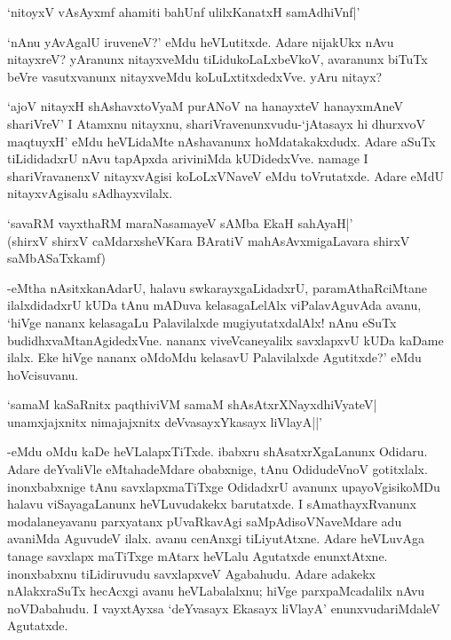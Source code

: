 \begin{shloka}
`nitoyxV vAsAyxmf ahamiti bahUnf ulilxKanatxH samAdhiVnf|'
\end{shloka}

`nAnu yAvAgalU iruveneV?' eMdu heVLutitxde. Adare nijakUkx nAvu nitayxreV? yAranunx nitayxveMdu tiLidukoLaLxbeVkoV, avaranunx biTuTx beVre vasutxvanunx nitayxveMdu koLuLxtitxdedxVve. yAru nitayx?

`ajoV nitayxH shAshavxtoV\s yaM purANoV na hanayxteV hanayxmAneV shariVreV' I Atamxnu nitayxnu, shariVravenunxvudu-`jAtasayx hi dhurxvoV maqtuyxH' eMdu heVLidaMte nAshavanunx hoMdatakakxdudx. Adare aSuTx tiLididadxrU nAvu tapApxda ariviniMda kUDidedxVve. namage I shariVravanenxV nitayxvAgisi koLoLxVNaveV eMdu toVrutatxde. Adare eMdU nitayxvAgisalu sAdhayxvilalx.

\begin{shloka}
`savaRM vayxthaRM maraNasamayeV sAMba EkaH sahAyaH|'\\
(shirxV shirxV caMdarxsheVKara BAratiV mahAsAvxmigaLavara shirxV\\
saMbASaTxkamf)
\end{shloka}

-eMtha nAsitxkanAdarU, halavu swkarayxgaLidadxrU, paramAthaRciMtane ilalxdidadxrU kUDa tAnu mADuva kelasagaLelAlx viPalavAguvAda avanu, `hiVge nananx kelasagaLu Palavilalxde mugiyutatxdalAlx! nAnu eSuTx budidhxvaMtanAgidedxVne. nananx viveVcaneyalilx savxlapxvU kUDa kaDame ilalx. Eke hiVge nananx oMdoMdu kelasavU Palavilalxde Agutitxde?' eMdu hoVcisuvanu.

\begin{shloka}
`samaM kaSaRnitx paqthiviVM samaM shAsAtxrXNayxdhiVyateV|\\
unamxjajxnitx nimajajxnitx deVvasayxYkasayx liVlayA||'
\end{shloka}

-eMdu oMdu kaDe heVLalapxTiTxde. ibabxru shAsatxrXgaLanunx Odidaru. Adare deYvaliVle eMtahadeMdare obabxnige, tAnu OdidudeVnoV gotitxlalx. inonxbabxnige tAnu savxlapxmaTiTxge OdidadxrU avanunx upayoVgisikoMDu halavu viSayagaLanunx heVLuvudakekx barutatxde. I sAmathayxRvanunx modalaneyavanu parxyatanx pUvaRkavAgi saMpAdisoVNaveMdare adu avaniMda AguvudeV ilalx. avanu cenAnxgi tiLiyutAtxne. Adare heVLuvAga tanage savxlapx maTiTxge mAtarx heVLalu Agutatxde enunxtAtxne. inonxbabxnu tiLidiruvudu savxlapxveV Agabahudu. Adare adakekx nAlakxraSuTx hecAcxgi avanu heVLabalalxnu; hiVge parxpaMcadalilx nAvu noVDabahudu. I vayxtAyxsa `deYvasayx Ekasayx liVlayA' enunxvudariMdaleV Agutatxde.

